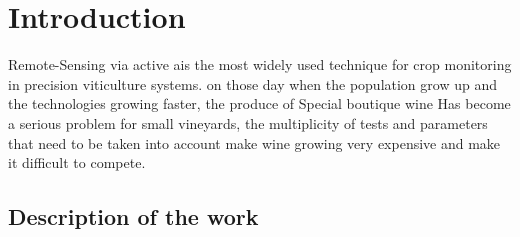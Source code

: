 \chapter{Introduction}

Remote-Sensing via active ais the most widely used technique for crop monitoring in precision viticulture systems.
on those day when the population grow up and the technologies growing faster, the produce of Special boutique wine Has become a serious problem for small vineyards, the multiplicity of tests and parameters that need to be taken into account make wine growing very expensive and make it difficult to compete.  





\section{Description of the work}




